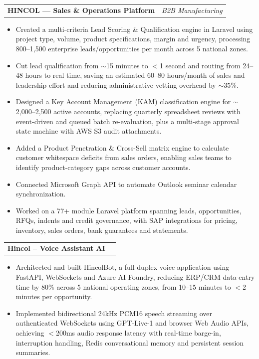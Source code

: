 \documentclass[10pt,a4paper]{article}
\makeatletter
\newcommand{\resumeRole}[2]{
  \begin{tabularx}{\textwidth}{@{}X r@{}}
    \textbf{#1} & \textit{#2}
  \end{tabularx}
  \vspace{-2pt}
}
\makeatother
\begin{document}
\resumeRole{HINCOL --- Sales \& Operations Platform}{B2B Manufacturing}
\begin{itemize}
  \item Created a multi-criteria Lead Scoring \& Qualification engine in Laravel using project type, volume, product specifications, margin and urgency, processing 800--1,500 enterprise leads/opportunities per month across 5 national zones.
  \item Cut lead qualification from $\sim$15 minutes to $<$1 second and routing from 24--48 hours to real time, saving an estimated 60--80 hours/month of sales and leadership effort and reducing administrative vetting overhead by $\sim$35\%.
  \item Designed a Key Account Management (KAM) classification engine for $\sim$2,000--2,500 active accounts, replacing quarterly spreadsheet reviews with event-driven and queued batch re-evaluation, plus a multi-stage approval state machine with AWS S3 audit attachments.
  \item Added a Product Penetration \& Cross-Sell matrix engine to calculate customer whitespace deficits from sales orders, enabling sales teams to identify product-category gaps across customer accounts.
  \item Connected Microsoft Graph API to automate Outlook seminar calendar synchronization.
  \item Worked on a 77+ module Laravel platform spanning leads, opportunities, RFQs, indents and credit governance, with SAP integrations for pricing, inventory, sales orders, bank guarantees and statements.
\end{itemize}

\resumeRole{Hincol -- Voice Assistant AI}{}
\begin{itemize}
  \item Architected and built HincolBot, a full-duplex voice application using FastAPI, WebSockets and Azure AI Foundry, reducing ERP/CRM data-entry time by 80\% across 5 national operating zones, from 10--15 minutes to $<$2 minutes per opportunity.
  \item Implemented bidirectional 24kHz PCM16 speech streaming over authenticated WebSockets using GPT-Live-1 and browser Web Audio APIs, achieving $<$200ms audio response latency with real-time barge-in, interruption handling, Redis conversational memory and persistent session summaries.
\end{itemize}
\end{document}
